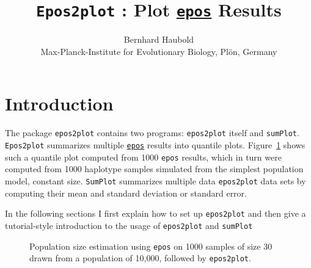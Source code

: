 \documentclass[a4paper]{article}
\newcommand{\ty}{\texttt}
\begin{document}
\title{\ty{Epos2plot} : Plot \href{http://github.com/evolbioinf/epos}{\ty{epos}} Results}
\author{Bernhard Haubold\\\small Max-Planck-Institute for Evolutionary
  Biology, Pl\"on, Germany}
\date{}
\maketitle
\section{Introduction}
The package \ty{epos2plot} contains two programs: \ty{epos2plot}
itself and \ty{sumPlot}. 
\ty{Epos2plot} summarizes multiple
\href{http://github.com/evolbioinf/epos}{\ty{epos}} results into
quantile plots. Figure~\ref{fig:qua} shows such a quantile plot 
computed from 1000 \ty{epos} \citep{lyn19:inf} results, which in turn
were computed from 1000 haplotype samples simulated
from the simplest population model, constant size. \ty{SumPlot}
summarizes multiple data \ty{epos2plot} data sets by computing their
mean and standard deviation or standard error.

In the following sections I first explain how to set up \ty{epos2plot}
and then give a tutorial-style introduction to the usage of
\ty{epos2plot} and \ty{sumPlot}

\begin{figure}
  \begin{center}
    \scalebox{0.6}{}
  \end{center}
  \caption{Population size estimation using \ty{epos} on 1000 samples
    of size 30 drawn from a population of 10,000, followed by
    \ty{epos2plot}.}\label{fig:qua}
\end{figure}
\end{document}
